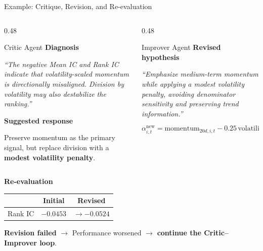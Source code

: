 \documentclass[10pt,aspectratio=169]{beamer}
\begin{document}
\begin{frame}{Example: Critique, Revision, and Re-evaluation}

\small

\begin{columns}[T,onlytextwidth]

\begin{column}{0.48\textwidth}

\begin{block}{Critic Agent}
\textbf{Diagnosis}


\emph{``The negative Mean IC and Rank IC indicate that
volatility-scaled momentum is directionally misaligned.
Division by volatility may also destabilize the ranking.''}

\vspace{0.15cm}

\textbf{Suggested response}


Preserve momentum as the primary signal, but replace division
with a \textbf{modest volatility penalty}.
\end{block}

\end{column}

\begin{column}{0.48\textwidth}

\begin{block}{Improver Agent}
\textbf{Revised hypothesis}


\emph{``Emphasize medium-term momentum while applying a modest
volatility penalty, avoiding denominator sensitivity and preserving
trend information.''}


\[
\alpha^{\mathrm{new}}_{i,t}
=
\text{momentum}_{20d,i,t}
-
0.25\,\text{volatility}_{20d,i,t}
\]
\end{block}

\end{column}

\end{columns}

\textbf{Re-evaluation}

\centering
{\footnotesize
\begin{tabular}{lcc}
\toprule
& \textbf{Initial} & \textbf{Revised} \\
\midrule
Rank IC  & $-0.0453$ & $\rightarrow -0.0524$ \\
\bottomrule
\end{tabular}
}

\textbf{Revision failed} $\rightarrow$
Performance worsened $\rightarrow$ \textbf{continue the Critic--Improver loop}.

\end{frame}
\end{document}
